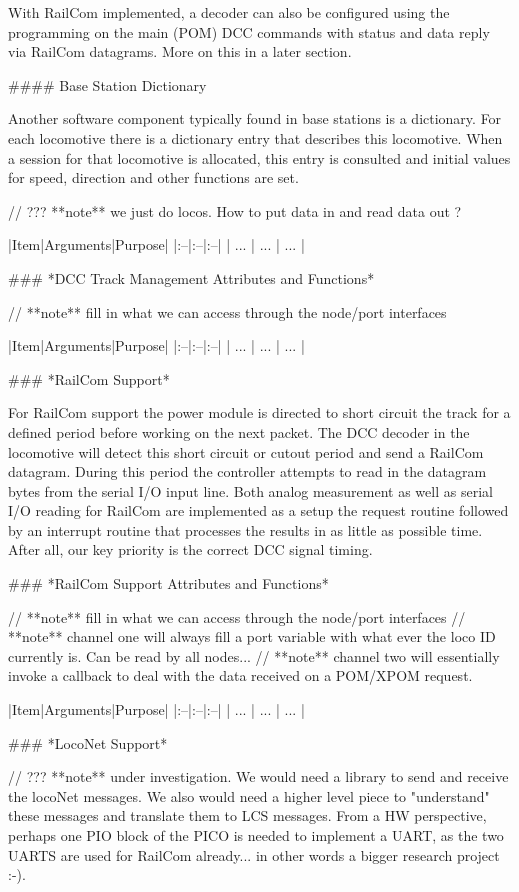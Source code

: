 With RailCom implemented, a decoder can also be configured using the programming on the main (POM) DCC commands with status and data reply via RailCom datagrams. More on this in a later section.

#### Base Station Dictionary

Another software component typically found in base stations is a dictionary. For each locomotive there is a dictionary entry that describes this locomotive. When a session for that locomotive is allocated, this entry is consulted and initial values for speed, direction and other functions are set.

// ??? **note** we just do locos. How to put data in and read data out ?

|Item|Arguments|Purpose|
|:--|:--|:--|
| ... | ... | ... |

### *DCC Track Management Attributes and Functions*

// **note** fill in what we can access through the node/port interfaces

|Item|Arguments|Purpose|
|:--|:--|:--|
| ... | ... | ... |

### *RailCom Support*

For RailCom support the power module is directed to short circuit the track for a defined period before working on the next packet. The DCC decoder in the locomotive will detect this short circuit or cutout period and send a RailCom datagram. During this period the controller attempts to read in the datagram bytes from the serial I/O input line. Both analog measurement as well as serial I/O reading for RailCom are implemented as a setup the request routine followed by an interrupt routine that processes the results in as little as possible time. After all, our key priority is the correct DCC signal timing.

### *RailCom Support Attributes and Functions*

// **note** fill in what we can access through the node/port interfaces
// **note** channel one will always fill a port variable with what ever the loco ID currently is. Can be read by all nodes...
// **note** channel two will essentially invoke a callback to deal with the data received on a POM/XPOM request.


|Item|Arguments|Purpose|
|:--|:--|:--|
| ... | ... | ... |

### *LocoNet Support*

// ??? **note** under investigation. We would need a library to send and receive the locoNet messages. We also would need a higher level piece to "understand" these messages and translate them to LCS messages. From a HW perspective, perhaps one PIO block of the PICO is needed to implement a UART, as the two UARTS are used for RailCom already... in other words a bigger research project :-).


